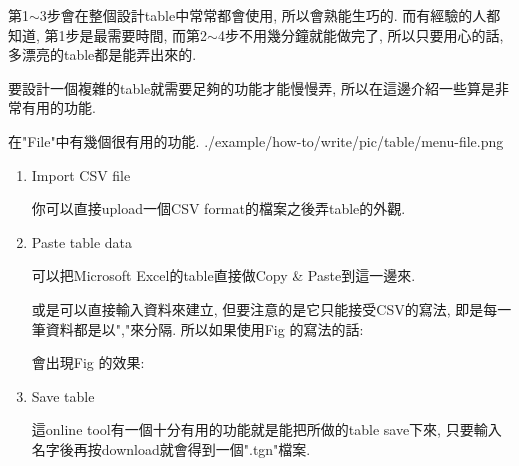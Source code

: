   第1$\sim$3步會在整個設計table中常常都會使用, 所以會熟能生巧的. 而有經驗的人都知道, 第1步是最需要時間, 而第2$\sim$4步不用幾分鐘就能做完了, 所以只要用心的話, 多漂亮的table都是能弄出來的.

\newpage
{}

要設計一個複雜的table就需要足夠的功能才能慢慢弄, 所以在這邊介紹一些算是非常有用的功能.


  在"File"中有幾個很有用的功能.
  \InsertCenterImage
    {./example/how-to/write/pic/table/menu-file.png}

  \begin{enumerate}

  \item
  {
    Import CSV file

    你可以直接upload一個CSV format的檔案之後弄table的外觀.
  } %

  \newpage
  \item
  {
    Paste table data

    可以把Microsoft Excel的table直接做Copy \& Paste到這一邊來.

    或是可以直接輸入資料來建立, 但要注意的是它只能接受CSV的寫法, 即是每一筆資料都是以","來分隔. 所以如果使用Fig 的寫法的話:

    會出現Fig 的效果:

  } %

  \newpage
  \item
  {
    Save table

    這online tool有一個十分有用的功能就是能把所做的table save下來, 只要輸入名字後再按download就會得到一個".tgn"檔案.

}
\end{enumerate}
